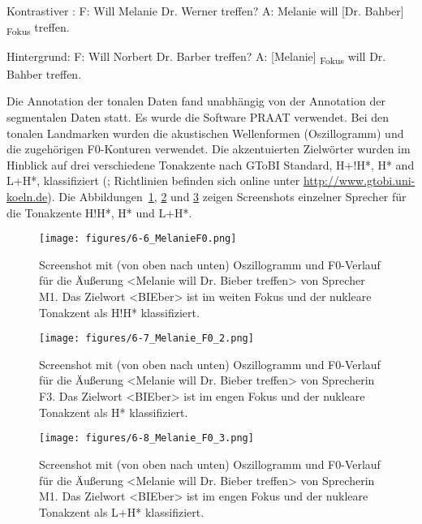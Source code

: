 \begin{exe}
	\ex Kontrastiver :\label{ex:0613}
	\sn F: Will Melanie Dr. Werner treffen?
	\sn A: Melanie will [Dr. Bahber]\textsubscript{ Fokus} treffen.
\end{exe}

\begin{exe}
	\ex Hintergrund:\label{ex:0614}
	\sn F: Will Norbert Dr. Barber treffen?
	\sn A: [Melanie]\textsubscript{ Fokus} will Dr. Bahber treffen.
\end{exe}

Die Annotation der tonalen Daten fand unabhängig von der Annotation der segmentalen Daten statt. Es wurde die Software PRAAT \citep{praat2010} verwendet. Bei den tonalen Landmarken wurden die akustischen Wellenformen (Oszillogramm) und die zugehörigen F0-Konturen verwendet. Die akzentuierten Zielwörter wurden im Hinblick auf drei verschiedene Tonakzente nach GToBI Standard, H+!H*, H* and L+H*, klassifiziert (\citealt{Grice2005}; Richtlinien befinden sich online unter \url{http://www.gtobi.uni-koeln.de}). Die Abbildungen~\ref{figure:0606}, \ref{figure:0607} und \ref{figure:0608} zeigen Screenshots einzelner Sprecher für die Tonakzente H!H*, H* und L+H*.

\begin{figure}[p]
	\texttt{[image: figures/6-6\_MelanieF0.png]}
	\caption{Screenshot mit (von oben nach unten) Oszillogramm und F0-Verlauf für die Äußerung <Melanie will Dr. Bieber treffen> von Sprecher M1. Das Zielwort <BIEber> ist im weiten Fokus und der nukleare Tonakzent als H!H* klassifiziert.}
	\label{figure:0606}
\end{figure}


\begin{figure}[p]
	\texttt{[image: figures/6-7\_Melanie\_F0\_2.png]}
	\caption{Screenshot mit (von oben nach unten) Oszillogramm und F0-Verlauf für die Äußerung <Melanie will Dr. Bieber treffen> von Sprecherin F3. Das Zielwort <BIEber> ist im engen Fokus und der nukleare Tonakzent als H* klassifiziert.}
	\label{figure:0607}
\end{figure}


\begin{figure}
	\texttt{[image: figures/6-8\_Melanie\_F0\_3.png]}
	\caption{Screenshot mit (von oben nach unten) Oszillogramm und F0-Verlauf für die Äußerung <Melanie will Dr. Bieber treffen> von Sprecherin M1. Das Zielwort <BIEber> ist im engen Fokus und der nukleare Tonakzent als L+H* klassifiziert.}
	\label{figure:0608}
\end{figure}



